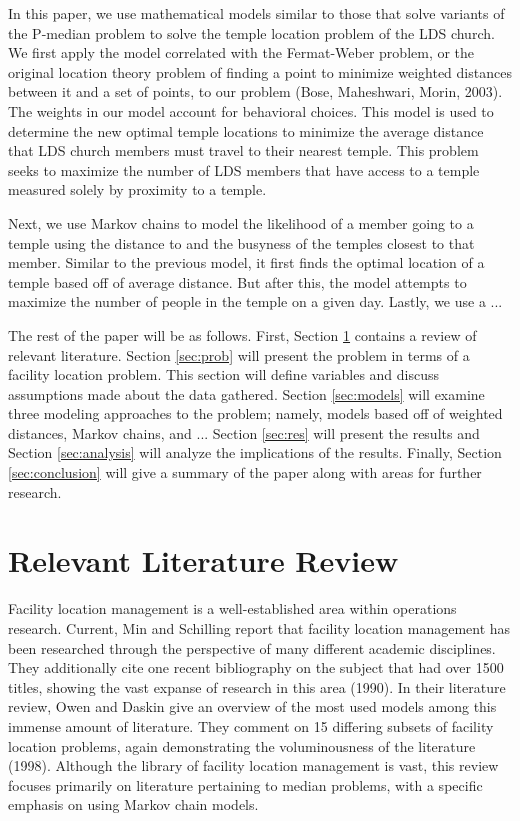 \documentclass[twoside,twocolumn]{article}
\begin{document}
In this paper, we use mathematical models similar to those that solve variants of the P-median problem to solve the temple location problem of the LDS church. %
We first apply the model correlated with the Fermat-Weber problem, or the original location theory problem of finding a point to minimize weighted distances between it and a set of points, to our problem (Bose, Maheshwari, Morin, 2003). %
The weights in our model account for behavioral choices.
This model is used to determine the new optimal temple locations to minimize the average distance that LDS church members must travel to their nearest temple.
This problem seeks to maximize the number of LDS members that have access to a temple measured solely by proximity to a temple.

Next, we use Markov chains to model the likelihood of a member going to a temple using the distance to and the busyness of the temples closest to that member.
Similar to the previous model, it first finds the optimal location of a temple based off of average distance.
But after this, the model attempts to maximize the number of people in the temple on a given day.
Lastly, we use a ... %

The rest of the paper will be as follows.
First, Section \ref{sec:litrev} contains a review of relevant literature.
Section \ref{sec:prob} will present the problem in terms of a facility location problem.
This section will define variables and discuss assumptions made about the data gathered.
Section \ref{sec:models} will examine three modeling approaches to the problem; namely, models based off of weighted distances, Markov chains, and ... %
Section \ref{sec:res} will present the results and Section \ref{sec:analysis} will analyze the implications of the results.
Finally, Section \ref{sec:conclusion} will give a summary of the paper along with areas for further research.

\section{Relevant Literature Review}
\label{sec:litrev}

Facility location management is a well-established area within operations research.
Current, Min and Schilling report that facility location management has been researched through the perspective of many different academic disciplines.
They additionally cite one recent bibliography on the subject that had over 1500 titles, showing the vast expanse of research in this area (1990).
In their literature review, Owen and Daskin give an overview of the most used models among this immense amount of literature. 
They comment on 15 differing subsets of facility location problems, again demonstrating the voluminousness of the literature (1998).
Although the library of facility location management is vast, this review focuses primarily on literature pertaining to median problems, with a specific emphasis on using Markov chain models.
\end{document}
